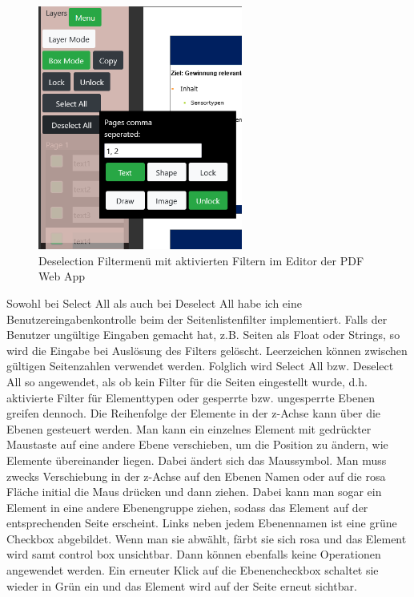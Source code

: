 \begin{figure}[!htbp]
	\centering
	\includegraphics[width=0.6\textwidth]{"images/filtering.png"}
	\caption{Deselection Filtermenü mit aktivierten Filtern im Editor der PDF Web App}
	\label{fig:filtering}
\end{figure}

Sowohl bei Select All als auch bei Deselect All habe ich eine Benutzereingabenkontrolle beim der Seitenlistenfilter implementiert. Falls der Benutzer ungültige Eingaben gemacht hat, z.B. Seiten als Float oder Strings, so wird die Eingabe bei Auslösung des Filters gelöscht. Leerzeichen können zwischen gültigen Seitenzahlen verwendet werden. Folglich wird Select All bzw. Deselect All so angewendet, als ob kein Filter für die Seiten eingestellt wurde, d.h. aktivierte Filter für Elementtypen oder gesperrte bzw. ungesperrte Ebenen greifen dennoch. Die Reihenfolge der Elemente in der z-Achse kann über die Ebenen gesteuert werden. Man kann ein einzelnes Element mit gedrückter Maustaste auf eine andere Ebene verschieben, um die Position zu ändern, wie Elemente übereinander liegen. Dabei ändert sich das Maussymbol. Man muss zwecks Verschiebung in der z-Achse auf den Ebenen Namen oder auf die rosa Fläche initial die Maus drücken und dann ziehen. Dabei kann man sogar ein Element in eine andere Ebenengruppe ziehen, sodass das Element auf der entsprechenden Seite erscheint. Links neben jedem Ebenennamen ist eine grüne Checkbox abgebildet. Wenn man sie abwählt, färbt sie sich rosa und das Element wird samt control box unsichtbar. Dann können ebenfalls keine Operationen angewendet werden. Ein erneuter Klick auf die Ebenencheckbox schaltet sie wieder in Grün ein und das Element wird auf der Seite erneut sichtbar. 

